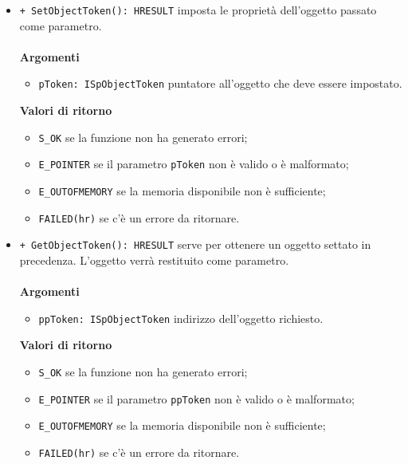      \begin{itemize}
     	\item \texttt{+ SetObjectToken(): HRESULT} imposta le proprietà dell'oggetto passato come parametro.
     	\\\\
     	\textbf{Argomenti}
		\begin{itemize}
			\item \texttt{pToken: ISpObjectToken} puntatore all'oggetto che deve essere impostato.
		\end{itemize}
     	\textbf{Valori di ritorno}
		\begin{itemize}
		 	\item \texttt{S\_OK} se la funzione non ha generato errori;
		 	\item \texttt{E\_POINTER} se il parametro \texttt{pToken} non è valido o è malformato;
		 	\item \texttt{E\_OUTOFMEMORY} se la memoria disponibile non è sufficiente;
		 	\item \texttt{FAILED(hr)} se c'è un errore da ritornare. 
		 \end{itemize}
	    
	     \item \texttt{+ GetObjectToken(): HRESULT} serve per ottenere un oggetto settato in precedenza. L'oggetto verrà restituito come parametro.
	     \\\\
	     \textbf{Argomenti}
		 \begin{itemize}
		     \item \texttt{ppToken: ISpObjectToken} indirizzo dell'oggetto richiesto.
		 \end{itemize}
	     \textbf{Valori di ritorno}
		 \begin{itemize}
		    \item \texttt{S\_OK} se la funzione non ha generato errori;
		    \item \texttt{E\_POINTER} se il parametro \texttt{ppToken} non è valido o è malformato;
		    \item \texttt{E\_OUTOFMEMORY} se la memoria disponibile non è sufficiente;
	     	\item \texttt{FAILED(hr)} se c'è un errore da ritornare. 
	     \end{itemize}
     \end{itemize}
      
